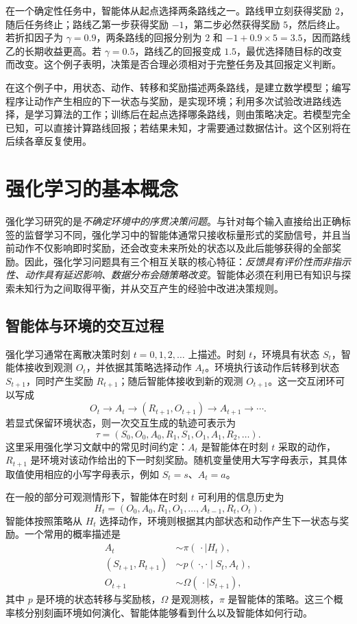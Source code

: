 \documentclass[UTF8,12pt,a4paper,fontset=fandol]{ctexbook}
\begin{document}
\begin{example}[先付出代价是否值得]
在一个确定性任务中，智能体从起点选择两条路线之一。路线甲立刻获得奖励 $2$，随后任务终止；路线乙第一步获得奖励 $-1$，第二步必然获得奖励 $5$，然后终止。若折扣因子为 $\gamma=0.9$，两条路线的回报分别为 $2$ 和 $-1+0.9\times5=3.5$，因而路线乙的长期收益更高。若 $\gamma=0.5$，路线乙的回报变成 $1.5$，最优选择随目标的改变而改变。这个例子表明，决策是否合理必须相对于完整任务及其回报定义判断。
\end{example}

在这个例子中，用状态、动作、转移和奖励描述两条路线，是建立数学模型；编写程序让动作产生相应的下一状态与奖励，是实现环境；利用多次试验改进路线选择，是学习算法的工作；训练后在起点选择哪条路线，则由策略决定。若模型完全已知，可以直接计算路线回报；若结果未知，才需要通过数据估计。这个区别将在后续各章反复使用。


\section{强化学习的基本概念}


强化学习研究的是\emph{不确定环境中的序贯决策问题}。与针对每个输入直接给出正确标签的监督学习不同，强化学习中的智能体通常只接收标量形式的奖励信号，并且当前动作不仅影响即时奖励，还会改变未来所处的状态以及此后能够获得的全部奖励。因此，强化学习问题具有三个相互关联的核心特征：\emph{反馈具有评价性而非指示性、动作具有延迟影响、数据分布会随策略改变}。智能体必须在利用已有知识与探索未知行为之间取得平衡，并从交互产生的经验中改进决策规则。


\subsection{智能体与环境的交互过程}


强化学习通常在离散决策时刻 $t=0,1,2,\ldots$ 上描述。时刻 $t$，环境具有状态 $S_t$，智能体接收到观测 $O_t$，并依据其策略选择动作 $A_t$。环境执行该动作后转移到状态 $S_{t+1}$，同时产生奖励 $R_{t+1}$；随后智能体接收到新的观测 $O_{t+1}$。这一交互闭环可以写成
\[
  O_t \longrightarrow A_t \longrightarrow (R_{t+1},O_{t+1})
  \longrightarrow A_{t+1} \longrightarrow \cdots .
\]
若显式保留环境状态，则一次交互生成的轨迹可表示为
\[
  \tau=(S_0,O_0,A_0,R_1,S_1,O_1,A_1,R_2,\ldots).
\]
这里采用强化学习文献中的常见时间约定：$A_t$ 是智能体在时刻 $t$ 采取的动作，$R_{t+1}$ 是环境对该动作给出的下一时刻奖励。随机变量使用大写字母表示，其具体取值使用相应的小写字母表示，例如 $S_t=s$、$A_t=a$。


在一般的部分可观测情形下，智能体在时刻 $t$ 可利用的信息历史为
\[
  H_t=(O_0,A_0,R_1,O_1,\ldots,A_{t-1},R_t,O_t).
\]
智能体按照策略从 $H_t$ 选择动作，环境则根据其内部状态和动作产生下一状态与奖励。一个常用的概率描述是
\begin{align*}
  A_t &\sim \pi(\,\cdot\mid H_t),\\
  (S_{t+1},R_{t+1}) &\sim p(\,\cdot,\cdot\mid S_t,A_t),\\
  O_{t+1} &\sim \Omega(\,\cdot\mid S_{t+1}),
\end{align*}
其中 $p$ 是环境的状态转移与奖励核，$\Omega$ 是观测核，$\pi$ 是智能体的策略。这三个概率核分别刻画环境如何演化、智能体能够看到什么以及智能体如何行动。
\end{document}
